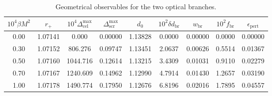 \begin{table}[t]
\centering
\caption{Geometrical observables for the two optical branches.}
\begin{tabular}{ccccccccc}
\hline
$10^4\beta M^2$ & $r_+$ & $10^4\Delta_{\mathrm{cel}}^{\max}$ & $\Delta_{\mathrm{scr}}^{\max}$ & $d_0$ & $10^2\delta d_{\mathrm{br}}$ & $w_{\mathrm{br}}$ & $10^2 f_{\mathrm{br}}$ & $\epsilon_{\mathrm{pert}}$ \\
\hline
0.00 & 1.07141 & 0.000 & 0.00000 & 1.13828 & 0.0000 & 0.00000 & 0.0000 & 0.00000 \\
0.30 & 1.07152 & 806.276 & 0.09747 & 1.13451 & 2.0637 & 0.00626 & 0.5514 & 0.01367 \\
0.50 & 1.07160 & 1044.716 & 0.12614 & 1.13215 & 3.4309 & 0.01031 & 0.9110 & 0.02279 \\
0.70 & 1.07167 & 1240.609 & 0.14962 & 1.12990 & 4.7914 & 0.01430 & 1.2657 & 0.03190 \\
1.00 & 1.07178 & 1490.774 & 0.17950 & 1.12676 & 6.8196 & 0.02016 & 1.7895 & 0.04557 \\
\hline
\end{tabular}
\end{table}
